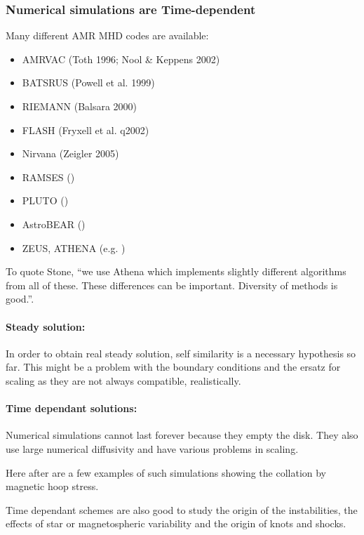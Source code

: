 \documentclass[10pt,a4paper,english]{article}
\begin{document}
\subsubsection{Numerical simulations are Time-dependent}
Many different AMR MHD codes are available:
\begin{itemize}
    \item AMRVAC (Toth 1996; Nool \& Keppens 2002)
    \item BATSRUS (Powell et al. 1999)
    \item RIEMANN (Balsara 2000)
    \item FLASH (Fryxell et al. q2002)
    \item Nirvana (Zeigler 2005)
    \item RAMSES (\cite{2006A&A...457..371F})
    \item PLUTO (\cite{2006MNRAS.368.1040M})
    \item AstroBEAR (\cite{2008PhDT.........2C})
    \item ZEUS, ATHENA (e.g. \cite{1990IAUS..140..351S})
\end{itemize}
To quote Stone, ``we use Athena which implements slightly different algorithms from all of these. These differences can be important. Diversity of methods is good.''.

\paragraph{Steady solution:}

In order to obtain real steady solution, self similarity is a necessary hypothesis so far. This might be a problem with the boundary conditions and the ersatz for scaling as they are not always compatible, realistically.

\paragraph{Time dependant solutions:}

Numerical simulations cannot last forever because they empty the disk. They also use large numerical diffusivity and have various problems in scaling.

Here after are a few examples of such simulations showing the collation by magnetic hoop stress.

Time dependant schemes are also good to study the origin of the instabilities, the effects of star or magnetospheric variability and the origin of knots and shocks.
\end{document}
